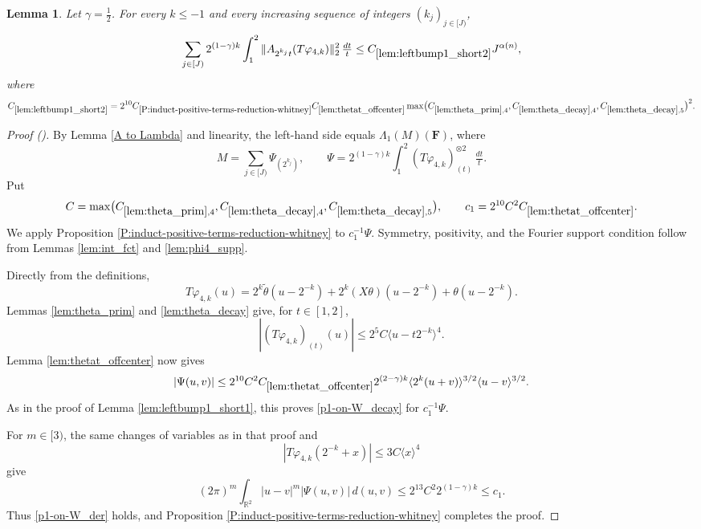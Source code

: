 \documentclass[12pt,reqno]{amsart}
\newcommand{\auto}{{({\tiny\faCar})}}
\theoremstyle{plain}
\newtheorem{lemma}[theorem]{Lemma}
\numberwithin{equation}{section}
\theoremstyle{remark}
\newcommand{\using}[1]{}
\newcommand{\R}{{\mathbb R}}
\newcommand{\F}{\mathbf{F}}
\begin{document}
\begin{lemma}\label{lem:leftbump1_short2}\using{A to Lambda}\using{lem:theta_prim}\using{lem:theta_decay}\using{lem:thetat_offcenter}\using{P:induct-positive-terms-reduction-whitney}\using{lem:int_fct}\using{lem:phi4_supp}\using{lem:leftbump1_short1}\using{P:induct-positive-terms-reduction-whitney-gap}
Let $\gamma=\frac12$. For every $k\le-1$ and every increasing sequence of integers $(k_j)_{j\in[J)}$,
\begin{equation}\label{auto:left-bump-one-short-two-bound}
\sum_{j\in[J)}2^{(1-\gamma)k}\int_1^2
\|A_{2^{k_j}t}(T\varphi_{4,k})\|_2^2\,\tfrac{dt}{t}
\le C_{\ref{lem:leftbump1_short2}}J^{\alpha(n)},
\end{equation}
where
\begin{equation}\label{auto:left-bump-one-short-two-constant-definition}
C_{\ref{lem:leftbump1_short2}}
=2^{10}C_{\ref{P:induct-positive-terms-reduction-whitney}}
C_{\ref{lem:thetat_offcenter}}
\max\bigl(C_{\ref{lem:theta_prim},4},C_{\ref{lem:theta_decay},4},C_{\ref{lem:theta_decay},5}\bigr)^2.
\end{equation}
\end{lemma}

\begin{proof}[Proof \auto]
By Lemma \ref{A to Lambda} and linearity, the left-hand side equals $\Lambda_1(M)(\F)$, where
\[
M=\sum_{j\in[J)}\Psi_{(2^{k_j})},
\qquad
\Psi=2^{(1-\gamma)k}\int_1^2(T\varphi_{4,k})_{(t)}^{\otimes2}\,\tfrac{dt}{t}.
\]
Put
\[
C=\max\bigl(C_{\ref{lem:theta_prim},4},C_{\ref{lem:theta_decay},4},C_{\ref{lem:theta_decay},5}\bigr),
\qquad
c_1=2^{10}C^2C_{\ref{lem:thetat_offcenter}}.
\]
We apply Proposition \ref{P:induct-positive-terms-reduction-whitney} to $c_1^{-1}\Psi$. Symmetry, positivity, and the Fourier support condition follow from Lemmas \ref{lem:int_fct} and \ref{lem:phi4_supp}.

Directly from the definitions,
\[
T\varphi_{4,k}(u)
=2^k\widetilde\theta(u-2^{-k})
+2^k(X\theta)(u-2^{-k})
+\theta(u-2^{-k}).
\]
Lemmas \ref{lem:theta_prim} and \ref{lem:theta_decay} give, for $t\in[1,2]$,
\[
|(T\varphi_{4,k})_{(t)}(u)|
\le2^5C\langle u-t2^{-k}\rangle^4.
\]
Lemma \ref{lem:thetat_offcenter} now gives
\[
|\Psi(u,v)|
\le2^{10}C^2C_{\ref{lem:thetat_offcenter}}
2^{(2-\gamma)k}
\langle2^k(u+v)\rangle^{3/2}
\langle u-v\rangle^{3/2}.
\]
As in the proof of Lemma \ref{lem:leftbump1_short1}, this proves \eqref{p1-on-W_decay} for $c_1^{-1}\Psi$.

For $m\in[3)$, the same changes of variables as in that proof and
\[
|T\varphi_{4,k}(2^{-k}+x)|\le3C\langle x\rangle^4
\]
give
\[
(2\pi)^m\int_{\R^2}|u-v|^m|\Psi(u,v)|\,d(u,v)
\le2^{13}C^2 2^{(1-\gamma)k}
\le c_1.
\]
Thus \eqref{p1-on-W_der} holds, and Proposition \ref{P:induct-positive-terms-reduction-whitney} completes the proof.
\end{proof}
\end{document}
